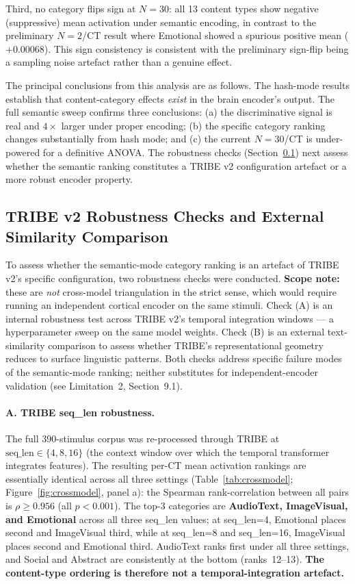 \documentclass[11pt,letterpaper]{article}
\numberwithin{equation}{section}
\begin{document}
Third, no category flips sign at $N=30$: all 13 content types show negative (suppressive) mean activation under semantic encoding, in contrast to the preliminary $N=2$/CT result where Emotional showed a spurious positive mean ($+0.00068$). This sign consistency is consistent with the preliminary sign-flip being a sampling noise artefact rather than a genuine effect.

The principal conclusions from this analysis are as follows. The hash-mode results establish that content-category effects \textit{exist} in the brain encoder's output. The full semantic sweep confirms three conclusions: (a) the discriminative signal is real and $4\times$ larger under proper encoding; (b) the specific category ranking changes substantially from hash mode; and (c) the current $N=30$/CT is under-powered for a definitive ANOVA. The robustness checks (Section~\ref{sec:crossmodel}) next assess whether the semantic ranking constitutes a TRIBE v2 configuration artefact or a more robust encoder property.

\subsection{TRIBE v2 Robustness Checks and External Similarity Comparison}\label{sec:crossmodel}

To assess whether the semantic-mode category ranking is an artefact of TRIBE v2's specific configuration, two robustness checks were conducted. \textbf{Scope note:} these are \emph{not} cross-model triangulation in the strict sense, which would require running an independent cortical encoder on the same stimuli. Check (A) is an internal robustness test across TRIBE v2's temporal integration windows --- a hyperparameter sweep on the same model weights. Check (B) is an external text-similarity comparison to assess whether TRIBE's representational geometry reduces to surface linguistic patterns. Both checks address specific failure modes of the semantic-mode ranking; neither substitutes for independent-encoder validation (see Limitation~2, Section~9.1).

\paragraph{A. TRIBE seq\_len robustness.}
The full 390-stimulus corpus was re-processed through TRIBE at $\text{seq\_len} \in \{4, 8, 16\}$ (the context window over which the temporal transformer integrates features). The resulting per-CT mean activation rankings are essentially identical across all three settings (Table~\ref{tab:crossmodel}; Figure~\ref{fig:crossmodel}, panel a): the Spearman rank-correlation between all pairs is $\rho \geq 0.956$ (all $p < 0.001$). The top-3 categories are \textbf{AudioText, ImageVisual, and Emotional} across all three seq\_len values; at seq\_len=4, Emotional places second and ImageVisual third, while at seq\_len=8 and seq\_len=16, ImageVisual places second and Emotional third. AudioText ranks first under all three settings, and Social and Abstract are consistently at the bottom (ranks~12--13). \textbf{The content-type ordering is therefore not a temporal-integration artefact.}
\end{document}
